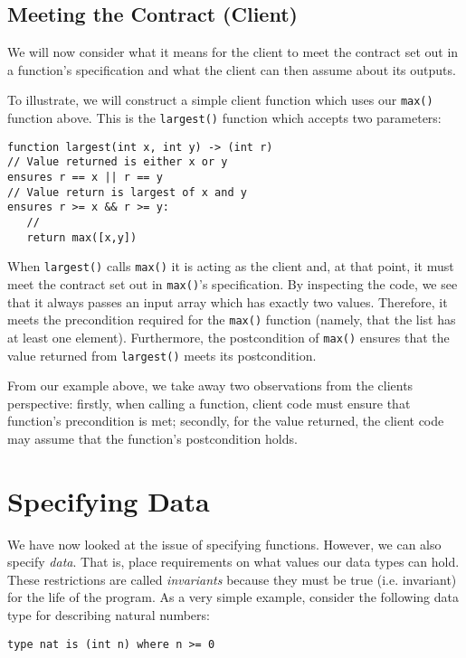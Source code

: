 \subsection{Meeting the Contract (Client)}

We will now consider what it means for the client to meet the contract set out in a function's specification and what the client can then assume about its outputs. 

\begin{eg}
To illustrate, we will construct a simple client function which uses our \lstinline{max()} function above.  This is the \lstinline{largest()} function which accepts two parameters:
\begin{lstlisting}
function largest(int x, int y) -> (int r)
// Value returned is either x or y
ensures r == x || r == y
// Value return is largest of x and y
ensures r >= x && r >= y:
   //
   return max([x,y])
\end{lstlisting}
When \lstinline{largest()} calls \lstinline{max()} it is acting as the client and, at that point, it must meet the contract set out in \lstinline{max()}'s specification.  By inspecting the code, we see that it always passes an input array which has exactly two values.  Therefore, it meets the precondition required for the \lstinline{max()} function (namely, that the list has at least one element).  Furthermore, the postcondition of \lstinline{max()} ensures that the value returned from \lstinline{largest()} meets its postcondition.
\end{eg}

From our example above, we take away two observations from the clients perspective:  firstly, when calling a function, client code must ensure that function's precondition is met; secondly, for the value returned, the client code may assume that the function's postcondition holds.

\section{Specifying Data}

We have now looked at the issue of specifying functions.  However, we can also specify {\em data}.  That is, place requirements on what values our data types can hold.  These restrictions are called {\em invariants} because they must be true (i.e. invariant) for the life of the program.  As a very simple example, consider the following data type for describing natural numbers:

\begin{lstlisting}
type nat is (int n) where n >= 0
\end{lstlisting}

